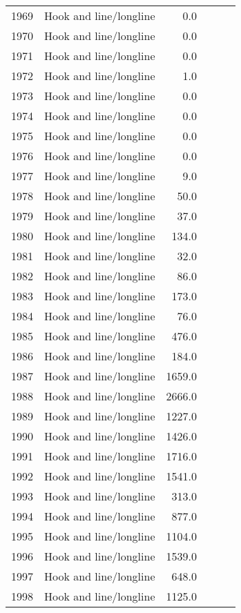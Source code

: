 \begin{longtable}[t]{llrrrr}
1969 & Hook and line/longline & 0.0 &  &  & \\
1970 & Hook and line/longline & 0.0 &  &  & \\
1971 & Hook and line/longline & 0.0 &  &  & \\
1972 & Hook and line/longline & 1.0 &  &  & \\
1973 & Hook and line/longline & 0.0 &  &  & \\
1974 & Hook and line/longline & 0.0 &  &  & \\
1975 & Hook and line/longline & 0.0 &  &  & \\
1976 & Hook and line/longline & 0.0 &  &  & \\
1977 & Hook and line/longline & 9.0 &  &  & \\
1978 & Hook and line/longline & 50.0 &  &  & \\
1979 & Hook and line/longline & 37.0 &  &  & \\
1980 & Hook and line/longline & 134.0 &  &  & \\
1981 & Hook and line/longline & 32.0 &  &  & \\
1982 & Hook and line/longline & 86.0 &  &  & \\
1983 & Hook and line/longline & 173.0 &  &  & \\
1984 & Hook and line/longline & 76.0 &  &  & \\
1985 & Hook and line/longline & 476.0 &  &  & \\
1986 & Hook and line/longline & 184.0 &  &  & \\
1987 & Hook and line/longline & 1659.0 &  &  & \\
1988 & Hook and line/longline & 2666.0 &  &  & \\
1989 & Hook and line/longline & 1227.0 &  &  & \\
1990 & Hook and line/longline & 1426.0 &  &  & \\
1991 & Hook and line/longline & 1716.0 &  &  & \\
1992 & Hook and line/longline & 1541.0 &  &  & \\
1993 & Hook and line/longline & 313.0 &  &  & \\
1994 & Hook and line/longline & 877.0 &  &  & \\
1995 & Hook and line/longline & 1104.0 &  &  & \\
1996 & Hook and line/longline & 1539.0 &  &  & \\
1997 & Hook and line/longline & 648.0 &  &  & \\
1998 & Hook and line/longline & 1125.0 &  &  & \\

\end{longtable}
